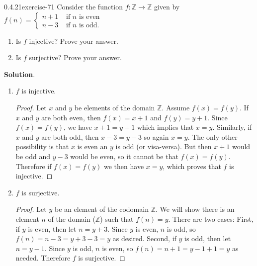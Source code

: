 \documentclass[twoside,11pt,]{book}
\numberwithin{equation}{chapter}
\newcommand{\Z}{\mathbb Z}
\newcommand{\amp}{&}
\begin{document}
\begin{divisionsolution}{0.4.21}{}{exercise-71}%
\hypertarget{p-1135}{}%
Consider the function \(f:\Z \to \Z\) given by \(f(n) = \begin{cases}n+1 \amp \text{ if }n\text{ is even} \\ n-3 \amp \text{ if }n\text{ is odd} . \end{cases}\)\leavevmode%
\begin{enumerate}[label=(\alph*)]
\item\hypertarget{li-917}{}\hypertarget{p-1136}{}%
Is \(f\) injective? Prove your answer.%
\item\hypertarget{li-918}{}\hypertarget{p-1137}{}%
Is \(f\) surjective? Prove your answer.%
\end{enumerate}
%
\par\smallskip%
\noindent\textbf{Solution}.\quad%
\hypertarget{p-1138}{}%
\leavevmode%
\begin{enumerate}[label=(\alph*)]
\item\hypertarget{li-919}{}\hypertarget{p-1139}{}%
\(f\) is injective.%
\begin{proof}{}
\hypertarget{p-1140}{}%
Let \(x\) and \(y\) be elements of the domain \(\Z\). Assume \(f(x) = f(y)\). If \(x\) and \(y\) are both even, then \(f(x) = x+1\) and \(f(y) = y+1\). Since \(f(x) = f(y)\), we have \(x + 1 = y + 1\) which implies that \(x = y\). Similarly, if \(x\) and \(y\) are both odd, then \(x - 3 = y-3\) so again \(x = y\). The only other possibility is that \(x\) is even an \(y\) is odd (or visa-versa). But then \(x + 1\) would be odd and \(y - 3\) would be even, so it cannot be that \(f(x) = f(y)\). Therefore if \(f(x) = f(y)\) we then have \(x = y\), which proves that \(f\) is injective.%
\end{proof}
\item\hypertarget{li-920}{}\hypertarget{p-1141}{}%
\(f\) is surjective.%
\begin{proof}{}
\hypertarget{p-1142}{}%
Let \(y\) be an element of the codomain \(\Z\). We will show there is an element \(n\) of the domain (\(\Z\)) such that \(f(n) = y\). There are two cases: First, if \(y\) is even, then let \(n = y+3\). Since \(y\) is even, \(n\) is odd, so \(f(n) = n-3 = y+3-3 = y\) as desired. Second, if \(y\) is odd, then let \(n = y-1\). Since \(y\) is odd, \(n\) is even, so \(f(n) = n+1 = y-1+1 = y\) as needed. Therefore \(f\) is surjective.%
\end{proof}
\end{enumerate}
%
\end{divisionsolution}%
\end{document}
